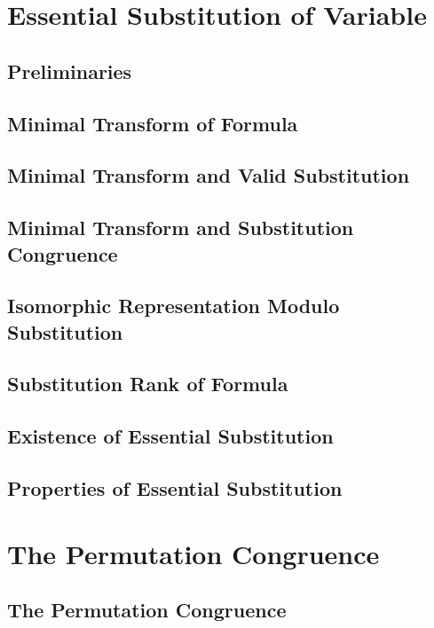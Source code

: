 \documentclass{report}
\begin{document}
\section{Essential Substitution of Variable}
    \subsection{Preliminaries}
      
    \subsection{Minimal Transform of Formula}
      
    \subsection{Minimal Transform and Valid Substitution}
      
    \subsection{Minimal Transform and Substitution Congruence}
      
    \subsection{Isomorphic Representation Modulo Substitution}
      
    \subsection{Substitution Rank of Formula}
      
    \subsection{Existence of Essential Substitution}
      
    \subsection{Properties of Essential Substitution}
      
\section{The Permutation Congruence}
    \subsection{The Permutation Congruence}
      
\end{document}
